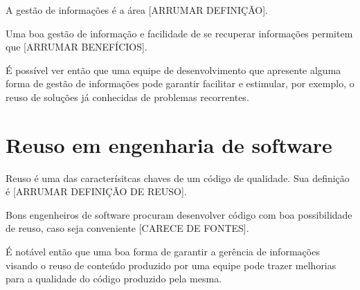 A gestão de informações é a área [ARRUMAR DEFINIÇÃO].


Uma boa gestão de informação e facilidade de se recuperar informações permitem que [ARRUMAR BENEFÍCIOS].

É possível ver então que uma equipe de desenvolvimento que apresente alguma forma de gestão de informações pode garantir facilitar e estimular, por exemplo, o reuso de soluções já conhecidas de problemas recorrentes.



\section{Reuso em engenharia de software}

Reuso é uma das caracterísitcas chaves de um código de qualidade. Sua definição é [ARRUMAR DEFINIÇÃO DE REUSO].

Bons engenheiros de software procuram desenvolver código com boa possibilidade de reuso, caso seja conveniente [CARECE DE FONTES].

É notável então que uma boa forma de garantir a gerência de informações visando o reuso de conteúdo produzido por uma equipe pode trazer melhorias para a qualidade do código produzido pela mesma.
